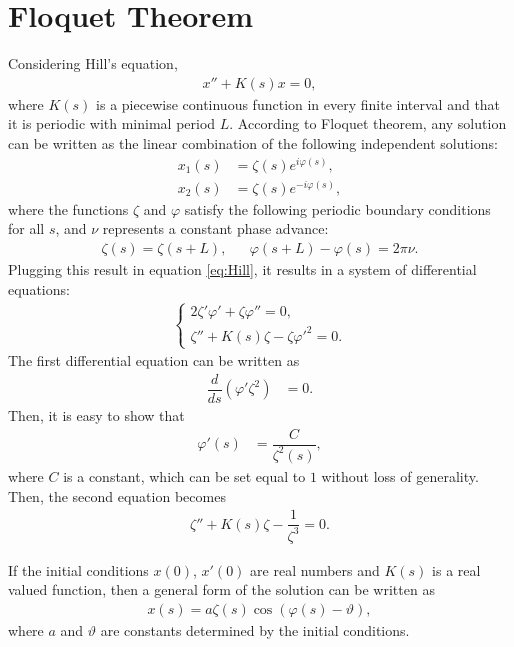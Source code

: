 \section{Floquet Theorem} \label{sec:FloquetTheorem}

Considering Hill's equation,
\begin{align}\label{eq:Hill}
	x''+K(s)x=0,
\end{align}
where $K(s)$ is a piecewise continuous function in every finite interval and that it is periodic with minimal period $L$. According to Floquet theorem, any solution can be written as the linear combination of the following independent solutions:
\begin{align*}
	x_1(s) &= \zeta(s) e^{i \varphi(s)}, \\
	x_2(s) &= \zeta(s) e^{-i \varphi(s)},
\end{align*}
where the functions $\zeta$ and $\varphi$ satisfy the following periodic boundary conditions for all $s$, and $\nu$ represents a constant phase advance:
\begin{align*}
	\zeta(s) = \zeta(s+L), && \varphi(s+L)-\varphi(s) = 2\pi \nu.
\end{align*}
Plugging this result in equation \eqref{eq:Hill}, it results in a system of differential equations:
\begin{align*}
	\begin{cases}
		2 \zeta' \varphi' + \zeta \varphi'' = 0, \\
		\zeta'' + K(s)\zeta - \zeta \varphi'^2 = 0.
	\end{cases}
\end{align*}
The first differential equation can be written as
\begin{align*}
	\dfrac{d}{ds}( \varphi' \zeta^2 ) &= 0.
\end{align*}
Then, it is easy to show that
\begin{align}
	\varphi'(s) &= \dfrac{C}{\zeta^2(s)},
\end{align}
where $C$ is a constant, which can be set equal to $1$ without loss of generality.
Then, the second equation becomes
\begin{align}
	\zeta'' + K(s) \zeta - \dfrac{1}{\zeta^3}=0.
\end{align}

If the initial conditions $x(0)$, $x'(0)$ are real numbers and $K(s)$ is a real valued function, then a general form of the solution can be written as
\begin{align}
	x(s) = a \zeta(s) \cos(\varphi(s) - \vartheta),
\end{align}
where $a$ and $\vartheta$ are constants determined by the initial conditions.